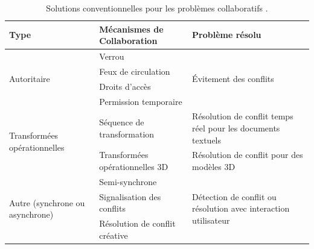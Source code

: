 \begin{table}
	\centering
	\noindent
	\caption{Solutions conventionnelles pour les problèmes collaboratifs 
	\cite{Yu2016}.}
	
	\small
	\label{table:collprobs}
	\begin{tabular}{ m{}  m{} m{}}\hline
		\textbf{Type}& \textbf{Mécanismes de Collaboration} & \textbf{Problème 
		résolu}    \\ \hline
		\multirow{4}{*}{Autoritaire}                     & Verrou                        & 
		\multirow{4}{*}{Évitement des conflits}                                          \\
		& Feux de circulation  
		&                                                                                  \\
		& Droits d'accès               
		&                                                                                  \\
		& Permission temporaire        
		&                                                                                  \\ \hline
		\multirow{2}{0.2\textwidth}{Transformées opérationnelles}                     & 
		Séquence de transformation                     & Résolution de conflit temps réel 
		pour les documents textuels                     \\ \cline{2-3} 
		& Transformées opérationnelles \gls{3D}                 & Résolution de conflit 
		pour  des modèles \gls{3D}                              \\ \hline
		\multirow{3}{0.2\textwidth}{Autre (synchrone ou asynchrone)} & 
		Semi-synchrone                               & \multirow{3}{0.3\textwidth}{Détection 
		de conflit ou résolution avec interaction utilisateur} \\
		& Signalisation des conflits %
		&                                                                                  \\
		& Résolution de conflit créative                 &                      \\ 
		\bottomrule                                                           
	\end{tabular}
\end{table}


